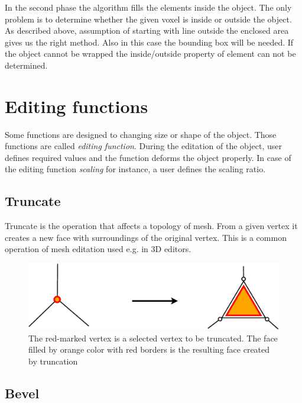 In the second phase the algorithm fills the elements inside the object. The only problem is to
determine whether the given voxel is inside or outside the object. As described above, assumption of
starting with line outside the enclosed area gives us the right method. Also in this case the
bounding box will be needed. If the object cannot be wrapped the inside/outside property of element can 
not be determined.

\section{Editing functions}

Some functions are designed to changing size or shape of the object. Those functions are called 
\emph{editing function}.
During the editation of the object, user defines required values and the function deforms the
object properly. In case of the editing function \emph{scaling} for instance, a user defines the scaling
ratio.

\subsection{Truncate}

Truncate is the operation that affects a topology of mesh. From a given vertex it creates a new face with
surroundings of the original vertex. This is a common operation of mesh editation used e.g. in
3D editors.\\

\begin{figure}[ht]
\centering
\includegraphics[scale=0.2]{../img/truncate.eps}
\caption{The red-marked vertex is a selected vertex to be truncated.
The face filled by orange color with red borders is the resulting face created by truncation}
\end{figure}


\subsection{Bevel}

